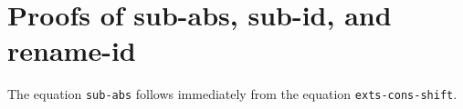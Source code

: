 \hypertarget{proofs-of-sub-abs-sub-id-and-rename-id}{%
\section{Proofs of sub-abs, sub-id, and
rename-id}\label{proofs-of-sub-abs-sub-id-and-rename-id}}

The equation \texttt{sub-abs} follows immediately from the equation
\texttt{exts-cons-shift}.

\begin{fence}
\begin{code}%
\>[0]%
\>[1402I]\AgdaSymbol{:}\AgdaSpace{}%
\AgdaSpace{}%
\AgdaSymbol{\}}\AgdaSpace{}%
\AgdaSymbol{\{}\AgdaSpace{}%
\AgdaSymbol{:}\AgdaSpace{}%
\AgdaSpace{}%
\AgdaSpace{}%
\AgdaSymbol{\}}\AgdaSpace{}%
\AgdaSymbol{\{}\AgdaSpace{}%
\AgdaSymbol{:}\AgdaSpace{}%
\AgdaSpace{}%
\AgdaOperator{\AgdaInductiveConstructor{,}}\AgdaSpace{}%
\AgdaSpace{}%
\AgdaSpace{}%
\AgdaSymbol{\}}\<%
\\
\>[.][@{}l@{}]\<[1402I]%
\>[8]\AgdaSpace{}%
\AgdaSpace{}%
\AgdaSpace{}%
\AgdaSpace{}%
\AgdaSymbol{(}\AgdaSpace{}%
\AgdaSymbol{)}\AgdaSpace{}%
\AgdaSpace{}%
\AgdaSpace{}%
\AgdaSpace{}%
\AgdaSymbol{(}\AgdaSpace{}%
\AgdaSymbol{)}\AgdaSpace{}%
\AgdaSpace{}%
\AgdaSymbol{(}\AgdaSpace{}%
\AgdaSpace{}%
\AgdaSymbol{)}\AgdaSpace{}%
\AgdaSpace{}%
\<%
\\
\>[0]\AgdaSpace{}%
\AgdaSymbol{\{}\AgdaSpace{}%
\AgdaSymbol{=}\AgdaSpace{}%
\AgdaSymbol{\}\{}\AgdaSpace{}%
\AgdaSymbol{=}\AgdaSpace{}%
\AgdaSymbol{\}}\AgdaSpace{}%
\AgdaSymbol{=}\<%
\\
\>[0][@{}l@{\AgdaIndent{0}}]%
\>[3]\<%
\\
\>[3][@{}l@{\AgdaIndent{0}}]%
\>[5]\AgdaSpace{}%
\AgdaSpace{}%

\end{code}
\end{fence}
